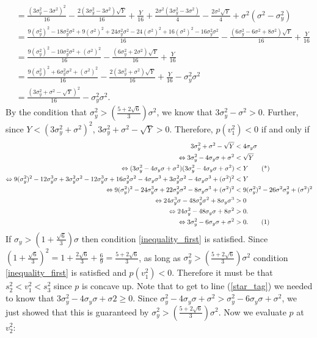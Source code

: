 \documentclass{article}
\newcommand\numberthis{\addtocounter{equation}{1}\tag{\theequation}}
\begin{document}
\begin{enumerate}
\begin{align*}
\\ &= \frac{(3\sigma_y^2-3\sigma^2)^2}{16}-\frac{2(3\sigma_y^2-3\sigma^2)\sqrt{Y}}{16}+\frac{Y}{16}+\frac{2\sigma^2(3\sigma_y^2-3\sigma^2)}{4}-\frac{2\sigma^2\sqrt{Y}}{4}+\sigma^2(\sigma^2-\sigma_y^2)
\\ &=\frac{9(\sigma_y^2)^2-18\sigma_y^2\sigma^2+9(\sigma^2)^2+24\sigma_y^2\sigma^2-24(\sigma^2)^2+16(\sigma^2)^2-16\sigma_y^2\sigma^2}{16}-\frac{(6\sigma_y^2-6\sigma^2+8\sigma^2)\sqrt{Y}}{16}+\frac{Y}{16}
\\&=\frac{9(\sigma_y^2)^2-10\sigma_y^2\sigma^2+(\sigma^2)^2}{16}-\frac{(6\sigma_y^2+2\sigma^2)\sqrt{Y}}{16}+\frac{Y}{16}
\\&=\frac{9(\sigma_y^2)^2+6\sigma_y^2\sigma^2+(\sigma^2)^2}{16}-\frac{2(3\sigma_y^2+\sigma^2)\sqrt{Y}}{16}+\frac{Y}{16}-\sigma_y^2\sigma^2
\\&=\frac{(3\sigma_y^2+\sigma^2-\sqrt{Y})^2}{16}-\sigma_y^2\sigma^2.
\end{align*}
By the condition that $\sigma_y^2>\left(\frac{5+2\sqrt{6}}{3}\right)\sigma^2$, we know that $3\sigma_y^2-\sigma^2>0$. Further, since $Y<(3\sigma_y^2+\sigma^2)^2$, $3\sigma_y^2+\sigma^2-\sqrt{Y}>0$. Therefore, $p(v_1^2)<0$ if and only if 
\begin{align*}
3\sigma_y^2+\sigma^2-\sqrt{Y}&<4\sigma_y\sigma
\\ \Leftrightarrow 3\sigma_y^2-4\sigma_y\sigma+\sigma^2&<\sqrt{Y}
\\ \Leftrightarrow (3\sigma_y^2-4\sigma_y\sigma+\sigma^2)(3\sigma_y^2-4\sigma_y\sigma+\sigma^2)&< Y \tag{*} \label{star_tag}
\\ \Leftrightarrow 9(\sigma_y^2)^2-12\sigma_y^3\sigma+3\sigma_y^2\sigma^2-12\sigma_y^3\sigma+16\sigma_y^2\sigma^2-4\sigma_y\sigma^3+3\sigma_y^2\sigma^2-4\sigma_y\sigma^3+(\sigma^2)^2&< Y
\\ \Leftrightarrow 9(\sigma_y^2)^2-24\sigma_y^3\sigma+22\sigma_y^2\sigma^2-8\sigma_y\sigma^3+(\sigma^2)^2&<9(\sigma_y^2)^2-26\sigma^2\sigma_y^2+(\sigma^2)^2
\\ \Leftrightarrow 24\sigma_y^3\sigma-48\sigma_y^2\sigma^2+8\sigma_y\sigma^3&>0
\\ \Leftrightarrow 24\sigma_y^2-48\sigma_y\sigma+8\sigma^2&>0.
\\ \Leftrightarrow 3\sigma_y^2-6\sigma_y\sigma+\sigma^2&>0. \numberthis \label{inequality_first}
\end{align*}
If $\sigma_y> (1+\frac{\sqrt{6}}{3})\sigma$ then condition \ref{inequality_first} is satisfied. Since $(1+\frac{\sqrt{6}}{3})^2=1+\frac{2\sqrt{6}}{3}+\frac{6}{9}=\frac{5+2\sqrt{6}}{3}$, as long as $\sigma_y^2>\left(\frac{5+2\sqrt{6}}{3}\right)\sigma^2$ condition \ref{inequality_first} is satisfied and $p(v_1^2)<0$. Therefore it must be that $s_2^2<v_1^2<s_3^2$ since $p$ is concave up. Note that to get to line (\ref{star_tag}) we needed to know that $3\sigma_y^2-4\sigma_y\sigma+\sigma2\geq0$. Since $\sigma_y^2-4\sigma_y\sigma+\sigma^2>\sigma_y^2-6\sigma_y\sigma+\sigma^2$, we just showed that this is guaranteed by $\sigma_y^2>\left(\frac{5+2\sqrt{6}}{3}\right)\sigma^2$. Now we evaluate $p$ at $v_2^2$:

\end{enumerate}
\end{document}
